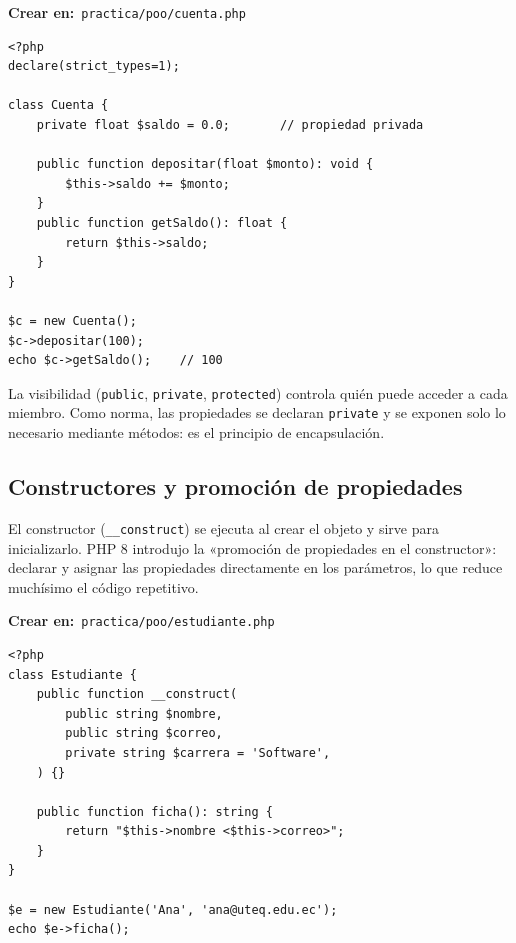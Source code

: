 \documentclass[11pt]{article}
\begin{document}
{\small\color{phpazulo}\textbf{Crear en:}~}\texttt{practica/\allowbreak{}poo/\allowbreak{}cuenta.\allowbreak{}php}\par\nobreak\vspace{-1pt}
\begin{cajacodigo}
\begin{lstlisting}[style=php]
<?php
declare(strict_types=1);

class Cuenta {
    private float $saldo = 0.0;       // propiedad privada

    public function depositar(float $monto): void {
        $this->saldo += $monto;
    }
    public function getSaldo(): float {
        return $this->saldo;
    }
}

$c = new Cuenta();
$c->depositar(100);
echo $c->getSaldo();    // 100
\end{lstlisting}
\end{cajacodigo}
\vspace{2pt}
La visibilidad (\texttt{public}, \texttt{private}, \texttt{protected}) controla quién puede acceder a cada miembro. Como norma, las propiedades se declaran \texttt{private} y se exponen solo lo necesario mediante métodos: es el principio de encapsulación.

\subsection{Constructores y promoción de propiedades}
El constructor (\texttt{\_\_construct}) se ejecuta al crear el objeto y sirve para inicializarlo. PHP 8 introdujo la «promoción de propiedades en el constructor»: declarar y asignar las propiedades directamente en los parámetros, lo que reduce muchísimo el código repetitivo.

{\small\color{phpazulo}\textbf{Crear en:}~}\texttt{practica/\allowbreak{}poo/\allowbreak{}estudiante.\allowbreak{}php}\par\nobreak\vspace{-1pt}
\begin{cajacodigo}
\begin{lstlisting}[style=php]
<?php
class Estudiante {
    public function __construct(
        public string $nombre,
        public string $correo,
        private string $carrera = 'Software',
    ) {}

    public function ficha(): string {
        return "$this->nombre <$this->correo>";
    }
}

$e = new Estudiante('Ana', 'ana@uteq.edu.ec');
echo $e->ficha();
\end{lstlisting}
\end{cajacodigo}
\vspace{2pt}
\end{document}

